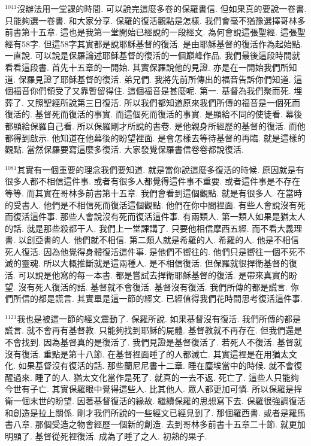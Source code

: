 \documentclass{book}
\begin{document}
$^{1041}$沒辦法用一堂課的時間.
可以說完這麼多卷的保羅書信.
但如果真的要說一卷書.
只能夠選一卷書.
和大家分享.
保羅的復活觀點是怎樣.
我們會毫不猶豫選擇哥林多前書第十五章.
這也是我第一堂開始已經說的一段經文.
為何會說這張聖經.
這張聖經有58字.
但這58字其實都是說耶穌基督的復活.
是由耶穌基督的復活作為起始點.
一直說.
可以說是保羅論述耶穌基督的復活的一個巔峰作品.
我們最後這段時間就看看這段書.
首先十五章的一開始.
其實保羅說他的見證.
亦是在一開始我們所知道.
保羅見證了耶穌基督的復活.
弟兄們.
我將先前所傳出的福音告訴你們知道.
這個福音你們領受了又靠暫留得住.
這個福音是甚麼呢.
第一.
基督為我們聚而死.
埋葬了.
又照聖經所說第三日復活.
所以我們都知道原來我們所傳的福音是一個死而復活的.
基督死而復活的事實.
而這個死而復活的事實.
是顯給不同的使徒看.
幕後都顯給保羅自己看.
所以保羅剛才所說的書卷.
是他親身所經歷的基督的復活.
而他都得到啟示.
他知道在他幕後的盼望裡面.
是會怎樣去等待基督的再臨.
就是這樣的觀點.
當然保羅要寫這麼多復活.
大家發覺保羅書信卷卷都說復活.

$^{1081}$其實有一個重要的理念我們要知道.
就是當你說這麼多復活的時候.
原因就是有很多人都不相信這件事.
或者有很多人都覺得這件事不重要.
或者這件事是不存在等等.
而其實在哥林多前書第十五章.
我們會看到這個觀點.
就是有很多人.
在當時的受書人.
他們是不相信死而復活這個觀點.
他們在你中間裡面.
有些人會說沒有死而復活這件事.
那些人會說沒有死而復活這件事.
有兩類人.
第一類人如果是猶太人的話.
就是那些殺都干人.
我們上一堂課講了.
只要他相信摩西五經.
而不看大義理書.
以創亞書的人.
他們就不相信.
第二類人就是希羅的人.
希羅的人.
他是不相信死人復活.
因為他覺得身體復活這件事.
是他們不嚮往的.
他們只是嚮往一個不死不滅的靈魂.
所以大概推斷就是這兩種人.
是不相信復活.
但保羅就很捍衛基督的復活.
可以說是他寫的每一本書.
都是嘗試去捍衛耶穌基督的復活.
是帶來真實的盼望.
沒有死人復活的話.
基督就不會復活.
基督沒有復活.
我們所傳的都是謊言.
你們所信的都是謊言.
其實單是這一節的經文.
已經值得我們花時間思考復活這件事.

$^{1121}$我也是被這一節的經文震動了.
保羅所說.
如果基督沒有復活.
我們所傳的都是謊言.
就不會再有基督教.
只能夠找到耶穌的屍體.
基督教就不再存在.
但我們還是不會找到.
因為基督真的是復活了.
我們見證是基督復活了.
若死人不復活.
基督就沒有復活.
重點是第十八節.
在基督裡面睡了的人都滅亡.
其實這裡是在用猶太文化.
如果基督沒有復活的話.
那些蘭尼尼書十二章.
睡在塵埃當中的時候.
就不會復醒過來.
睡了的人.
猶太文化當作是死了.
就真的一去不返.
死亡了.
這些人只能夠今世有子亡.
其實保羅眼中覺得這些人.
比其他人.
眾人都更加可憐.
所以保羅是捍衛一個末世的盼望.
因著基督復活的緣故.
繼續保羅的思想寫下去.
保羅很強調復活和創造是拉上關係.
剛才我們所說的一些經文已經見到了.
那個羅西書.
或者是羅馬書八章.
那個受造之物會經歷一個新的創造.
去到哥林多前書十五章二十節.
就更加明顯了.
基督從死裡復活.
成為了睡了之人.
初熟的果子.
\end{document}

